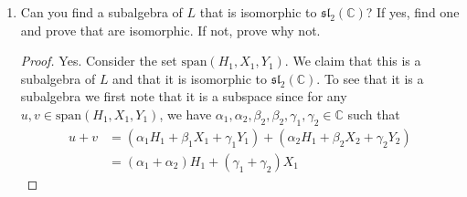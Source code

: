 \documentclass[12pt]{article}
\theoremstyle{definition}
\begin{document}
\begin{enumerate}
\begin{enumerate}[label=(\alph*)]
\begin{proof}
                        We will show that $\mathcal{H}$ is not an ideal.
                        Consider $H_2\in\mathcal{H}$ and
                        $Y_1\in\mathfrak{sl}_3(\mathbb{C})$. Then by part
                        2.(a), we have that $[H_2, Y_1]=Y_1$. If $\mathcal{H}$
                        were an ideal, then it would follow that
                        $Y_1\in\mathcal{H}$. However, this would imply that 
                        \begin{equation*}
                            Y_1=\begin{pmatrix}0&0&0\\1&0&0\\0&0&0\end{pmatrix}
                            =\begin{pmatrix}\alpha&0&0\\0&\beta-\alpha&0\\0&0&-\beta\end{pmatrix}  
                        \end{equation*}
                        for some $\alpha, \beta\in \mathbb{C}$, which is not
                        possible. Therefore, $\mathcal{H}$ is not an ideal.
                    \end{proof}
                \item Can you find a subalgebra of $L$ that is isomorphic to
                    $\mathfrak{sl}_2(\mathbb{C})$? If yes, find one and prove
                    that are isomorphic. If not, prove why not.
                    \begin{proof}
                        Yes. Consider the set $\text{span}(H_1, X_1, Y_1)$. We
                        claim that this is a subalgebra of $L$ and that it is
                        isomorphic to $\mathfrak{sl}_2(\mathbb{C})$. To see
                        that it is a subalgebra we first note that it is
                        a subspace since for any $u, v\in\text{span}(H_1, X_1,
                        Y_1)$, we have $\alpha_1, \alpha_2, \beta_2, \beta_2,
                        \gamma_1, \gamma_2\in \mathbb{C}$ such that 
                        \begin{equation*}
                            \begin{split}
                                u+v &= (\alpha_1 H_1+\beta_1 X_1+\gamma_1
                                Y_1)+(\alpha_2 H_1+\beta_2 X_2+\gamma_2 Y_2) \\
                                &=(\alpha_1+\alpha_2)H_1+(\gamma_1+\gamma_2)X_1

\end{split}
\end{equation*}
\end{proof}
\end{enumerate}
\end{enumerate}
\end{document}
